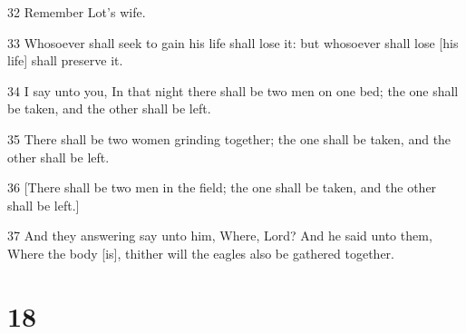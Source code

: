 \par 32 Remember Lot's wife.
\par 33 Whosoever shall seek to gain his life shall lose it: but whosoever shall lose [his life] shall preserve it.
\par 34 I say unto you, In that night there shall be two men on one bed; the one shall be taken, and the other shall be left.
\par 35 There shall be two women grinding together; the one shall be taken, and the other shall be left.
\par 36 [There shall be two men in the field; the one shall be taken, and the other shall be left.]
\par 37 And they answering say unto him, Where, Lord? And he said unto them, Where the body [is], thither will the eagles also be gathered together.

\chapter{18}

